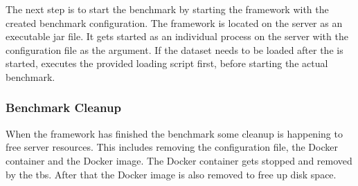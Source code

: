 The next step is to start the benchmark by starting the \iguana{} framework with the created benchmark configuration.
The \iguana{} framework is located on the server as an executable jar file.
It gets started as an individual process on the server with the configuration file as the argument.
If the dataset needs to be loaded after the \ts{} is started, \iguana{} executes the provided loading script first, before starting the actual benchmark.


\subsubsection{Benchmark Cleanup}
When the \iguana{} framework has finished the benchmark some cleanup is happening to free server resources.
This includes removing the \iguana{} configuration file, the Docker container and the Docker image.
The Docker container gets stopped and removed by the \ac{tbs}.
After that the Docker image is also removed to free up disk space.






